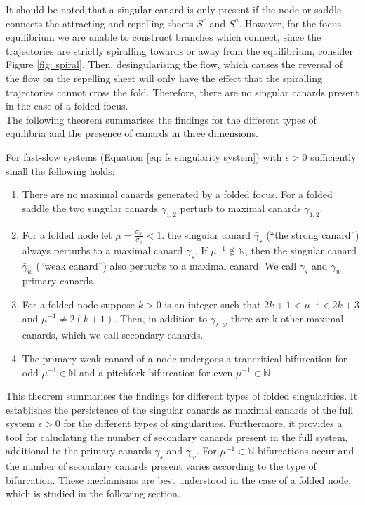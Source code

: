 It should be noted that a singular canard is only present if the node or saddle connects the attracting and repelling sheets $ S^r $ and $ S^a $.
However, for the focus equilibrium we are unable to construct branches which connect, since the trajectories are strictly spiralling towards or away from the equilibrium, consider Figure \ref{fig: spiral}. Then, desingularising the flow, which causes the reversal of the flow on the repelling sheet will only have the effect that the spiralling trajectories cannot cross the fold. Therefore, there are no singular canards present in the case of a folded focus.\\

The following theorem summarises the findings for the different types of equilibria and the presence of canards in three dimensions.
\begin{theorem}\label{thm: canards in R3}
	For fast-slow systems (Equation \ref{eq: fs singularity system}) with $ \epsilon>0 $ sufficiently small the following holds:
\begin{enumerate}
\item  There are no maximal canards generated by a folded focus. For a folded saddle the two singular canards $ \bar{\gamma}_{1,2} $ perturb to maximal canards $ \gamma_{1,2} $.
\item  For a folded node let $\mu=\frac{\sigma_w}{\sigma_s} <1$. the singular canard $ \bar{\gamma}_{s} $ (``the strong canard'') always perturbs to a maximal canard $ \gamma_{s} $. If $ \mu^{-1}\not \in \mathbb{N} $, then the singular canard $ \bar{\gamma}_{w} $ (``weak canard'') also perturbs to a maximal canard. We call $ \gamma_{s} $ and $ \gamma_{w} $ primary canards.
\item For a folded node suppose $ k>0 $ is an integer such that $ 2k+1<\mu^{-1} <2k+3$ and $ \mu^{-1}\neq 2(k+1) $. Then, in addition to $ \gamma_{s,w} $ there are k other maximal canards, which we call secondary canards.
\item The primary weak canard of a node undergoes a trancritical bifurcation for odd $ \mu^{-1}\in\mathbb{N} $ and a pitchfork bifurcation for even $ \mu^{-1}\in\mathbb{N} $
\end{enumerate}
\end{theorem}
This theorem summarises the findings for different types of folded singularities. It establishes the persistence of the singular canards as maximal canards of the full system $\epsilon >0$ for the different types of singularities. Furthermore, it provides a tool for caluclating the number of secondary canards present in the full system, additional to the primary canards $\gamma_s$ and $\gamma_w$.
For $ \mu^{-1}\in\mathbb{N} $ bifurcations occur and the number of secondary canards present varies according to the type of bifurcation.
These mechanisms are best understood in the case of a folded node, which is studied in the following section.


